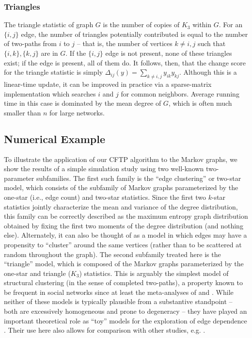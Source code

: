 \documentclass[11pt]{article}
\begin{document}
\subsubsection{Triangles}

The triangle statistic of graph $G$ is the number of copies of $K_3$ within $G$.  For an $\{i,j\}$ edge, the number of triangles potentially contributed is equal to the number of two-paths from $i$ to $j$ -- that is, the number of vertices $k \neq i,j$ such that $\{i,k\},\{k,j\}$ are in $G$.  If the $\{i,j\}$ edge is not present, none of these triangles exist; if the edge is present, all of them do.  It follows, then, that the change score for the triangle statistic is simply $\Delta_{ij}(y) = \sum_{k\neq i,j} y_{ik}y_{kj}$.  Although this is a linear-time update, it can be improved in practice via a sparse-matrix implementation which searches $i$ and $j$ for common neighbors.  Average running time in this case is dominated by the mean degree of $G$, which is often much smaller than $n$ for large networks.

\subsection{Numerical Example}

To illustrate the application of our CFTP algorithm to the Markov graphs, we show the results of a simple simulation study using two well-known two-parameter subfamilies.  The first such family is the ``edge clustering'' or two-star model, which consists of the subfamily of Markov graphs parameterized by the one-star (i.e., edge count) and two-star statistics.  Since the first two $k$-star statistics jointly characterize the mean and variance of the degree distribution, this family can be correctly described as the maximum entropy graph distribution obtained by fixing the first two moments of the degree distribution (and nothing else).  Alternately, it can also be thought of as a model in which edges may have a propensity to ``cluster'' around the same vertices (rather than to be scattered at random throughout the graph).  The second subfamily treated here is the ``triangle'' model, which is composed of the Markov graphs parameterized by the one-star and triangle ($K_3$) statistics.  This is arguably the simplest model of structural clustering (in the sense of completed two-paths), a property known to be frequent in social networks since at least the meta-analyses of \citet{davis:asr:1970} and \citet{holland.leinhardt:ajs:1972}.  While neither of these models is typically plausible from a substantive standpoint -- both are excessively homogeneous and prone to degeneracy -- they have played an important theoretical role as ``toy'' models for the exploration of edge dependence \citep[see, e.g.][]{jonasson:jap:1999,haggstrom.jonasson:jap:1999,handcock:ch:2003,burda.et.al:prevE:2004,park.newman:prevE:2004}.  Their use here also allows for comparison with other studies, e.g. \citet{handcock:ch:2003}.
\end{document}
